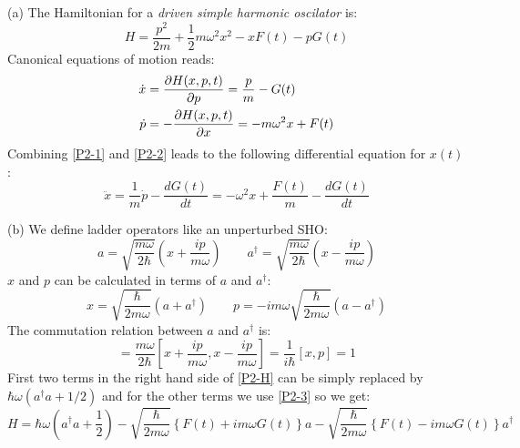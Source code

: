 \begin{homeworkProblem}
\begin{homeworkSection}{(a)}
The Hamiltonian for a \textit{driven simple harmonic oscilator} is:
\begin{equation}\label{P2-H}
H=\frac{p^2}{2m}+\frac{1}{2}m\omega^2 x^2-xF(t)-pG(t)
\end{equation}
Canonical equations of motion reads:
\begin{align}
\dot{x}&=\dfrac{\partial H(x,p,t)}{\partial p}=\frac{p}{m}-G(t)\label{P2-1}\\
\dot{p}&=-\dfrac{\partial H(x,p,t)}{\partial x}=-m\omega^2 x+F(t)\label{P2-2}
\end{align} 
Combining \eqref{P2-1} and \eqref{P2-2} leads to the following differential equation for $x(t)$:
\begin{equation}
\ddot{x}=\frac{1}{m}\dot{p}-\frac{dG(t)}{dt}=-\omega^2 x+\frac{F(t)}{m}-\frac{dG(t)}{dt}
\end{equation}
\end{homeworkSection}
\begin{homeworkSection}{(b)}
We define ladder operators like an unperturbed SHO:
\begin{equation}
a=\sqrt{\frac{m\omega}{2\hbar}}\left(x+\frac{ip}{m\omega}\right)\qquad
a^\dagger=\sqrt{\frac{m\omega}{2\hbar}}\left(x-\frac{ip}{m\omega}\right)
\end{equation}
$x$ and $p$ can be calculated in terms of $a$ and $a^\dagger$:
\begin{equation}\label{P2-3}
x=\sqrt{\frac{\hbar}{2m\omega}}\left(a+a^{\dagger}\right)\qquad
p=-im\omega\sqrt{\frac{\hbar}{2m\omega}}\left(a-a^{\dagger}\right)
\end{equation}
The commutation relation between $a$ and $a^\dagger$ is:
\begin{equation}
[a,a^\dagger]=\frac{m\omega}{2\hbar}\left[x+\frac{ip}{m\omega},x-\frac{ip}{m\omega}\right]=\frac{1}{i\hbar}[x,p]=1
\end{equation}
First two terms in the right hand side of \eqref{P2-H} can be simply replaced by $\hbar\omega(a^\dagger a+1/2)$ and for the other terms we use \eqref{P2-3} so we get:
\begin{equation}\label{P2-H2}
H=\hbar\omega\left(a^\dagger a+\frac{1}{2}\right)-\sqrt{\frac{\hbar}{2m\omega}}\left\{F(t)+im\omega G(t)\right\} a-\sqrt{\frac{\hbar}{2m\omega}}\left\{F(t)-im\omega G(t)\right\} a^\dagger
\end{equation} 
\end{homeworkSection}

\end{homeworkProblem}
